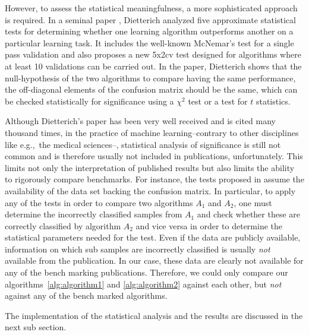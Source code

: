 \documentclass{ieeeaccess}
\begin{document}
However, to assess the statistical meaningfulness, a more sophisticated approach is required. In a seminal paper \cite{Dietterich}, Dietterich analyzed five approximate statistical tests for determining whether one learning algorithm outperforms another on a particular learning task. It includes the well-known McNemar’s test for a single pass validation and also proposes a new 5x2cv test designed for algorithms where at least 10 validations can be carried out. In the paper, Dietterich shows that the null-hypothesis of the two algorithms to compare having the same performance, the off-diagonal elements of the confusion matrix should be the same, which can be checked statistically for significance using a $\chi^2$ test or a test for $t$ statistics.
	
Although Dietterich's paper has been very well received and is cited many thousand times, in the practice of machine learning--contrary to other disciplines like e.g.,\ the medical sciences--, statistical analysis of significance is still not common and is therefore usually not included in publications, unfortunately. This limits not only the interpretation of published results but also limits the ability to rigorously compare benchmarks. For instance, the tests proposed in \cite{Dietterich} assume the availability of the data set backing the confusion matrix. In particular, to apply any of the tests in order to compare two algorithms $A_1$ and $A_2$, one must determine the incorrectly classified samples from $A_1$ and check whether these are correctly classified by algorithm $A_2$ and vice versa in order to determine the statistical parameters needed for the test. Even if the data are publicly available, information on which sub samples are incorrectly classified is usually \emph{not} available from the publication. In our case, these data are clearly not available for any of the bench marking publications. Therefore, we could only compare our algorithms~\ref{alg:algorithm1} and \ref{alg:algorithm2} against each other, but \emph{not} against any of the bench marked algorithms. 
	
The implementation of the statistical analysis and the results are discussed in the next sub section. 

\end{document}
